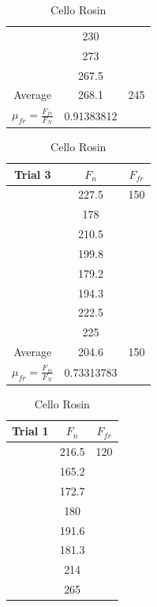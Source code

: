 \documentclass[12pt]{article}
\begin{document}
\begin{table}
\begin{tabular} {| c  c  c |}
                & 230           &           \\
                & 273           &           \\
                & 267.5         &           \\
        \hline
        Average & 268.1         & 245       \\
        \hline
        $\mu_{fr} = \frac{F_{fr}}{F_{N}}$ & 0.91383812 & \\
        \hline
    \end{tabular}
    \hfill
    \begin{tabular} {| c  c  c |}
        \hline
        Trial 3 & $F_{n}$       & $F_{fr}$  \\
        \hline
                & 227.5         & 150       \\
                & 178           &           \\
                & 210.5         &           \\
                & 199.8         &           \\
                & 179.2         &           \\
                & 194.3         &           \\
                & 222.5         &           \\
                & 225           &           \\
        \hline
        Average & 204.6         & 150       \\
        \hline
        $\mu_{fr} = \frac{F_{fr}}{F_{N}}$ & 0.73313783 & \\
        \hline
    \end{tabular}
    \caption{Cello Rosin}
    \begin{tabular}[t]{| c  c  c |}
        \hline
        Trial 1 & $F_{n}$       & $F_{fr}$  \\
        \hline
                & 216.5         & 120       \\
                & 165.2         &           \\
                & 172.7         &           \\
                & 180           &           \\
                & 191.6         &           \\
                & 181.3         &           \\
                & 214           &           \\
                & 265           &           \\

\end{tabular}
\end{table}
\end{document}
